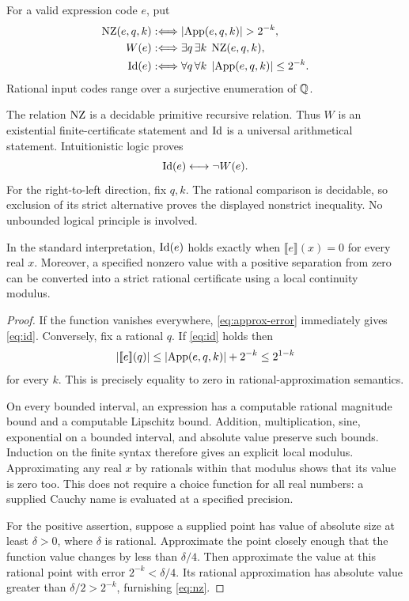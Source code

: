 \begin{definition}
For a valid expression code $e$, put
\begin{align}
 \NZ(e,q,k)&:\Longleftrightarrow
       \abs{\App(e,q,k)}>2^{-k},\label{eq:nz}\\
 W(e)&:\Longleftrightarrow\exists q\,\exists k\;\NZ(e,q,k),\label{eq:w}\\
 \Id(e)&:\Longleftrightarrow
       \forall q\,\forall k\;\abs{\App(e,q,k)}\le2^{-k}.
       \label{eq:id}
\end{align}
Rational input codes range over a surjective enumeration of $\mathbb Q$.
\end{definition}

The relation $\operatorname{NZ}$ is a decidable primitive recursive relation. Thus $W$
is an existential finite-certificate statement and $\operatorname{Id}$ is a universal
arithmetical statement. Intuitionistic logic proves
\begin{equation}\label{eq:id-neg-w}
 \operatorname{Id}(e)\longleftrightarrow\neg W(e).
\end{equation}
For the right-to-left direction, fix $q,k$. The rational comparison is
decidable, so exclusion of its strict alternative proves the displayed
nonstrict inequality. No unbounded logical principle is involved.

\begin{proposition}\label{prop:semantics}
In the standard interpretation, $\operatorname{Id}(e)$ holds exactly when
$\llbracket e\rrbracket(x)=0$ for every real $x$.
Moreover, a specified nonzero value with a positive separation from zero
can be converted into a strict rational certificate using a local
continuity modulus.
\end{proposition}
\begin{proof}
If the function vanishes everywhere, \eqref{eq:approx-error} immediately
gives \eqref{eq:id}. Conversely, fix a rational $q$. If \eqref{eq:id}
holds then
\[
 \left|[\![ e]\!](q)\right|
 \le \left|\operatorname{App}(e,q,k)\right|+2^{-k}\le2^{1-k}
\]
for every $k$. This is precisely equality to zero in rational-approximation
semantics.

On every bounded interval, an expression has a computable rational
magnitude bound and a computable Lipschitz bound. Addition, multiplication,
sine, exponential on a bounded interval, and absolute value preserve such
bounds. Induction on the finite syntax therefore gives an explicit local
modulus. Approximating any real $x$ by rationals within that modulus shows
that its value is zero too. This does not require a choice function for all
real numbers: a supplied Cauchy name is evaluated at a specified precision.

For the positive assertion, suppose a supplied point has value of absolute
size at least $\delta>0$, where $\delta$ is rational. Approximate the point
closely enough that the function value changes by less than $\delta/4$.
Then approximate the value at this rational point with error
$2^{-k}<\delta/4$. Its rational approximation has absolute value greater
than $\delta/2>2^{-k}$, furnishing \eqref{eq:nz}.
\end{proof}

